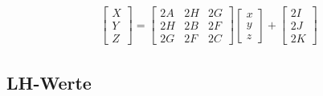 \begin{align}
\begin{bmatrix}
           X \\
           Y \\
           Z
         \end{bmatrix}    
 	= \begin{bmatrix}
           2A & 2H & 2G \\
           2H & 2B & 2F \\
           2G & 2F & 2C
         \end{bmatrix}
         \begin{bmatrix}
           x \\
           y \\
           z
         \end{bmatrix}
	+\begin{bmatrix}
           2I \\
           2J \\
           2K
         \end{bmatrix}
  \end{align}



\subsection{LH-Werte}

